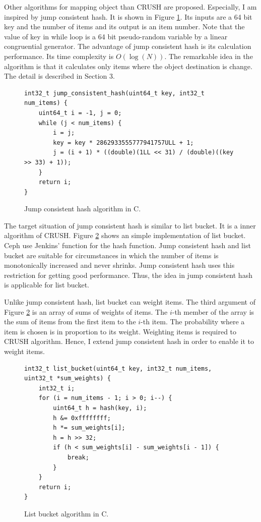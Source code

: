 \documentclass[a4paper,11pt]{article}
\begin{document}
Other algorithms for mapping object than CRUSH are proposed. Especially, I am inspired by jump consistent hash\cite{jump-consistent-hash}. It is shown in Figure \ref{code_jumpconsistenthash}.
Its inputs are a 64 bit key and the number of items and its output is  an item number.
Note that the value of key in while loop is a 64 bit pseudo-random variable by a linear congruential generator\cite{lecuyer}.
The advantage of jump consistent hash is its calculation performance.
Its time complexity is $O(\log(N))$.
The remarkable idea in the algorithm is that it calculates only items where the object destination is change.
The detail is described in Section 3.

\begin{figure}[tbp]
\lstset{language=C}
\begin{footnotesize}
\begin{lstlisting}[frame=single]
int32_t jump_consistent_hash(uint64_t key, int32_t num_items) {
    uint64_t i = -1, j = 0;
    while (j < num_items) {
        i = j;
        key = key * 2862933555777941757ULL + 1;
        j = (i + 1) * ((double)(1LL << 31) / (double)((key >> 33) + 1));
    }
    return i;
}
\end{lstlisting}
\end{footnotesize}
\caption{Jump consistent hash algorithm in C.}
\label{code_jumpconsistenthash}
\end{figure}

The target situation of jump consistent hash is similar to list bucket. It is a inner algorithm of CRUSH.
Figure \ref{code_listbucket} shows an simple implementation of list bucket. Ceph use Jenkins' function\cite{jenkins} for the hash function.
Jump consistent hash and list bucket are suitable for circumstances in which the number of items is monotonically increased and never shrinks.
Jump consistent hash uses this restriction for getting good performance.
Thus, the idea in jump consistent hash is applicable for list bucket.

Unlike jump consistent hash, list bucket can weight items.
The third argument of Figure \ref{code_listbucket} is an array of sums of weights of items.
The $i$-th member of the array is the sum of items from the first item to the $i$-th item.
The probability where a item is chosen is in proportion to its weight.
Weighting items is required to CRUSH algorithm.
Hence, I extend jump consistent hash in order to enable it to weight items.

\begin{figure}[tbp]
\lstset{language=C}
\begin{footnotesize}
\begin{lstlisting}[frame=single]
int32_t list_bucket(uint64_t key, int32_t num_items, uint32_t *sum_weights) {
    int32_t i;
    for (i = num_items - 1; i > 0; i--) {
        uint64_t h = hash(key, i);
        h &= 0xffffffff;
        h *= sum_weights[i];
        h = h >> 32;
        if (h < sum_weights[i] - sum_weights[i - 1]) {
            break;
        }
    }
    return i;
}
\end{lstlisting}
\end{footnotesize}
\caption{List bucket algorithm in C.}
\label{code_listbucket}
\end{figure}
\end{document}
